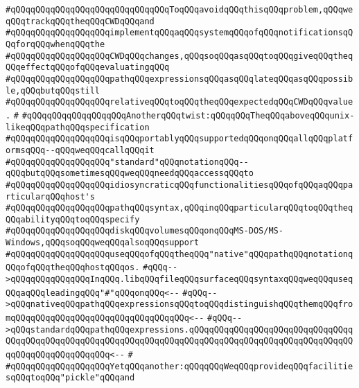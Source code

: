 \verb|#qQQqqQQqqQQqqQQqqQQqqQQqqQQqqQQqToqQQqavoidqQQqthisqQQqproblem,qQQqweqQQqtrackqQQqtheqQQqCWDqQQqand|\newline
\verb|#qQQqqQQqqQQqqQQqqQQqimplementqQQqaqQQqsystemqQQqofqQQqnotificationsqQQqforqQQqwhenqQQqthe|\newline
\verb|#qQQqqQQqqQQqqQQqqQQqCWDqQQqchanges,qQQqsoqQQqasqQQqtoqQQqgiveqQQqtheqQQqeffectqQQqofqQQqevaluatingqQQq|\newline
\verb|#qQQqqQQqqQQqqQQqqQQqpathqQQqexpressionsqQQqasqQQqlateqQQqasqQQqpossible,qQQqbutqQQqstill|\newline
\verb|#qQQqqQQqqQQqqQQqqQQqrelativeqQQqtoqQQqtheqQQqexpectedqQQqCWDqQQqvalue.|\newline
\verb|#|\newline
\verb|#qQQqqQQqqQQqqQQqqQQqAnotherqQQqtwist:qQQqqQQqTheqQQqaboveqQQqunix-likeqQQqpathqQQqspecification|\newline
\verb|#qQQqqQQqqQQqqQQqqQQqisqQQqportablyqQQqsupportedqQQqonqQQqallqQQqplatformsqQQq--qQQqweqQQqcallqQQqit|\newline
\verb|#qQQqqQQqqQQqqQQqqQQq"standard"qQQqnotationqQQq--qQQqbutqQQqsometimesqQQqweqQQqneedqQQqaccessqQQqto|\newline
\verb|#qQQqqQQqqQQqqQQqqQQqidiosyncraticqQQqfunctionalitiesqQQqofqQQqaqQQqparticularqQQqhost's|\newline
\verb|#qQQqqQQqqQQqqQQqqQQqpathqQQqsyntax,qQQqinqQQqparticularqQQqtoqQQqtheqQQqabilityqQQqtoqQQqspecify|\newline
\verb|#qQQqqQQqqQQqqQQqqQQqdiskqQQqvolumesqQQqonqQQqMS-DOS/MS-Windows,qQQqsoqQQqweqQQqalsoqQQqsupport|\newline
\verb|#qQQqqQQqqQQqqQQqqQQquseqQQqofqQQqtheqQQq"native"qQQqpathqQQqnotationqQQqofqQQqtheqQQqhostqQQqos.|\newline
\verb|#qQQq-->qQQqqQQqqQQqqQQqInqQQq.libqQQqfileqQQqsurfaceqQQqsyntaxqQQqweqQQquseqQQqaqQQqleadingqQQq"#"qQQqonqQQq<--|\newline
\verb|#qQQq-->qQQqnativeqQQqpathqQQqexpressionsqQQqtoqQQqdistinguishqQQqthemqQQqfromqQQqqQQqqQQqqQQqqQQqqQQqqQQqqQQqqQQq<--|\newline
\verb|#qQQq-->qQQqstandardqQQqpathqQQqexpressions.qQQqqQQqqQQqqQQqqQQqqQQqqQQqqQQqqQQqqQQqqQQqqQQqqQQqqQQqqQQqqQQqqQQqqQQqqQQqqQQqqQQqqQQqqQQqqQQqqQQqqQQqqQQqqQQqqQQqqQQqqQQq<--|\newline
\verb|#|\newline
\verb|#qQQqqQQqqQQqqQQqqQQqYetqQQqanother:qQQqqQQqWeqQQqprovideqQQqfacilitiesqQQqtoqQQq"pickle"qQQqand|\newline

